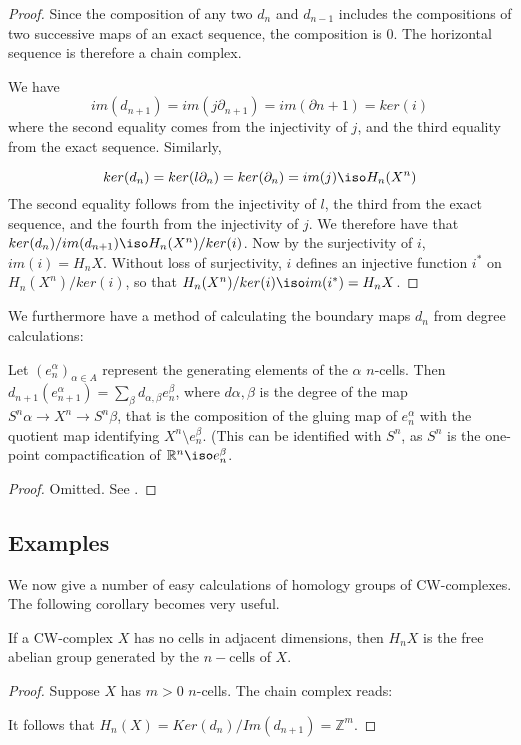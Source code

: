 \begin{proof}
Since the composition of any two $d_n$ and $d_{n-1}$ includes the compositions of two successive maps of an exact sequence, the composition is $0$. The horizontal sequence is therefore a chain complex.

We have $$im(d_{n+1})=im(j \partial_{n+1})=im(\partial{n+1})=ker(i)$$
where the second equality comes from the injectivity of $j$, and the third equality from the exact sequence. Similarly,

$$ker(d_n)=ker(l \partial_n)=ker(\partial_n)=im(j)\iso H_n(X^n)$$
The second equality follows from the injectivity of $l$, the third from the exact sequence, and the fourth from the injectivity of $j$. We therefore have that 
$ker(d_n)/im(d_{n+1})\iso H_n(X^n)/ker(i)$. Now by the surjectivity of $i$, $im(i)=H_n X$. Without loss of surjectivity, $i$ defines an injective function $i^*$ on $H_n(X^n)/ker(i)$, so that $H_n(X^n)/ker(i)\iso im(i^*)=H_n X$.\cite{Hatcher}\end{proof}

We furthermore have a method of calculating the boundary maps $d_n$ from degree calculations:
\begin{theorem}\label{boundary-formula} Let $(e^{\alpha}_n)_{\alpha\in A}$ represent the generating elements of the $\alpha$ $n$-cells. Then 
$d_{n+1}(e^{\alpha}_{n+1})=\sum_{\beta} d_{\alpha,\beta} e^{\beta}_{n}$, where $d{\alpha,\beta}$ is the degree of the map $S^{n}\alpha\rightarrow X^n\rightarrow S^n\beta$, that is the composition of the gluing map of $e^{\alpha}_n$ with the quotient map identifying $X^n\setminus e^{\beta}_n$. (This can be identified with $S^n$, as $S^n$ is the one-point compactification of $\mathbb{R}^n\iso e^{\beta}_n$.
\end{theorem}
\begin{proof}
Omitted. See \cite{Hatcher}.
\end{proof}

\subsection{Examples}
We now give a number of easy calculations of homology groups of CW-complexes. The following corollary becomes very useful.

\begin{corollary}\label{cell-adjacent} If a CW-complex $X$ has no cells in adjacent dimensions, then $H_n X$ is the free abelian group generated by the $n-$cells of $X$.
\end{corollary}
\begin{proof}
Suppose $X$ has $m>0$ $n$-cells. The chain complex reads:


It follows that $H_n(X)=Ker(d_n)/Im(d_{n+1})=\mathbb{Z}^m$.
\end{proof}

